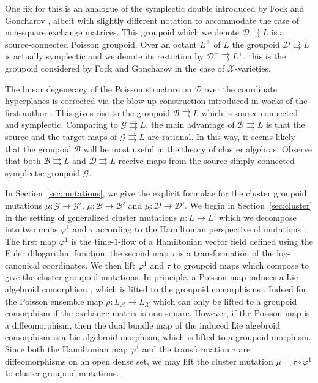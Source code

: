 \documentclass{amsart}
\numberwithin{equation}{section}
\newcommand{\cA}{\mathcal{A}}
\newcommand{\cB}{\mathcal{B}}
\newcommand{\cD}{\mathcal{D}}
\newcommand{\cG}{\mathcal{G}}
\newcommand{\cX}{\mathcal{X}}
\newcommand{\rra}{\rightrightarrows}
\begin{document}
One fix for this is an analogue of the symplectic double introduced by Fock and Goncharov \cite{FG09c}, albeit with slightly different notation to accommodate the case of non-square exchange matrices.
This groupoid which we denote $\cD \rra L$ is a source-connected Poisson groupoid.
Over an octant $L^+$ of $L$ the groupoid $\cD \rra L$ is actually symplectic and we denote its restiction by $\cD^+ \rra L^+$, this is the groupoid considered by Fock and Goncharov in the case of $\cX$-varieties.

The linear degeneracy of the Poisson structure on $\cD$ over the coordinate hyperplanes is corrected via the blow-up construction introduced in works of the first author \cite{MR3312911,MR3214314}.
This gives rise to the groupoid $\cB \rra L$ which is source-connected and symplectic.
Comparing to $\cG \rra L$, the main advantage of $\cB \rra L$ is that the source and the target maps of $\cG \rra L$ are rational.
In this way, it seems likely that the groupoid $\cB$ will be most useful in the theory of cluster algebras.
Observe that both $\cB \rra L$ and $\cD \rra L$ receive maps from the source-simply-connected symplectic groupoid $\cG$.

In Section~\ref{sec:mutations}, we give the explicit formulae for the cluster groupoid mutations $\mu: \cG \to \cG'$, $\mu: \cB \to \cB'$ and $\mu: \cD \to \cD'$.
We begin in Section~\ref{sec:cluster} in the setting of generalized cluster mutations $\mu: L \to L'$ which we decompose into two maps $\varphi^1$ and $\tau$ according to the Hamiltonian perspective of mutations \cite{FG09a, MR3691969}.
The first map $\varphi^1$ is the time-$1$-flow of a Hamiltonian vector field defined using the Euler dilogarithm function; the second map $\tau$ is a transformation of the log-canonical coordinates.
We then lift $\varphi^1$ and $\tau$ to groupoid maps which compose to give the cluster groupoid mutations.
In principle, a Poisson map induces a Lie algebroid comorphism \cite{Higgins1990}, which is lifted to the groupoid comorphisms \cite{MR2063018, MR3089758}. Indeed for the Poisson ensemble map $\rho: L_\cA \to L_\cX$ which can only be lifted to a groupoid comorphism if the exchange matrix is non-square. However, if the Poisson map is a diffeomorphism, then the dual bundle map of the induced Lie algebroid comorphism is a Lie algebroid morphism, which is lifted to a groupoid morphism.
Since both the Hamiltonian map $\varphi^1$ and the transformation $\tau$ are diffeomorphisms on an open dense set, we may lift the cluster mutation $\mu = \tau \circ \varphi^1$ to cluster groupoid mutations.
\bigskip
\end{document}
